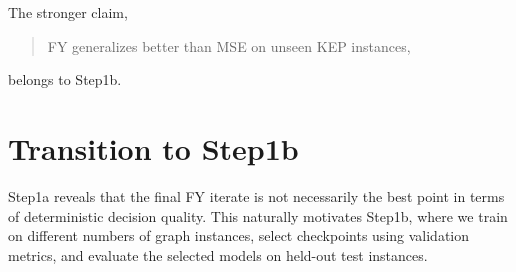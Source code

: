 \documentclass[11pt]{article}
\begin{document}
The stronger claim,

\begin{quote}
FY generalizes better than MSE on unseen KEP instances,
\end{quote}

belongs to Step1b.

\section{Transition to Step1b}

Step1a reveals that the final FY iterate is not necessarily the best point in
terms of deterministic decision quality. This naturally motivates Step1b, where
we train on different numbers of graph instances, select checkpoints using
validation metrics, and evaluate the selected models on held-out test instances.
\end{document}
